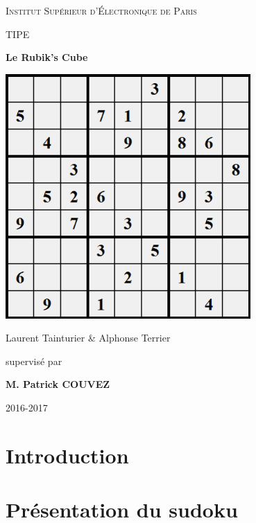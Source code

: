 \documentclass[12pt,a4paper]{report}
\newenvironment{changemargin}[2]{\begin{list}{}{%
\setlength{\topsep}{0pt}%
\setlength{\leftmargin}{0pt}%
\setlength{\rightmargin}{0pt}%
\setlength{\listparindent}{\parindent}%
\setlength{\itemindent}{\parindent}%
\setlength{\parsep}{0pt plus 1pt}%
\addtolength{\leftmargin}{#1}%
\addtolength{\rightmargin}{#2}%
}\item }{\end{list}}
\begin{document}
\FloatBarrier

\begin{titlepage}
\begin{changemargin}{-1cm}{0cm}
	\centering
	\vspace{5cm}
	{\scshape\huge Institut Supérieur d'Électronique de Paris \par}
	\vspace{1cm}
	{\scshape\LARGE TIPE\par}
	\vspace{1.5cm}
	{\fontsize{45}{45}\selectfont\bfseries Le Rubik's Cube\par}
	\vspace{2cm}
	\includegraphics[width=0.7\textwidth]{../pictures/pagedegarde.png}\par\vspace{1.5cm}
	{\LARGE Laurent Tainturier \& Alphonse Terrier\par}
	\vfill
	\large supervisé par\par
	\large \bfseries M. Patrick COUVEZ

	\vfill


	{\large 2016-2017}
\end{changemargin}
\end{titlepage}

\tableofcontents
{}
\chapter*{Introduction}
	

	\chapter{Présentation du sudoku}
	
\end{document}
